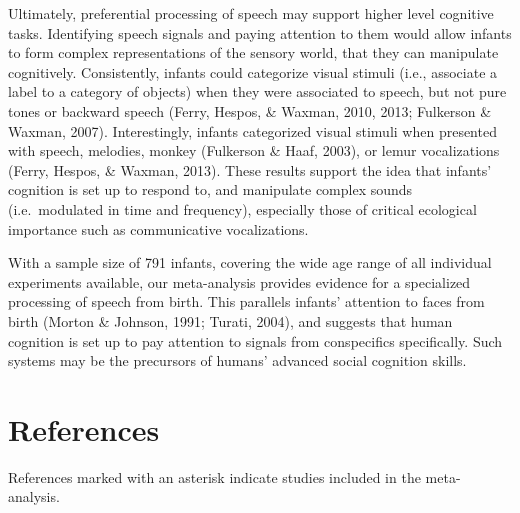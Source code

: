 \documentclass[
  english,
  man]{apa6}
\begin{document}
Ultimately, preferential processing of speech may support higher level cognitive tasks. Identifying speech signals and paying attention to them would allow infants to form complex representations of the sensory world, that they can manipulate cognitively. Consistently, infants could categorize visual stimuli (i.e., associate a label to a category of objects) when they were associated to speech, but not pure tones or backward speech (Ferry, Hespos, \& Waxman, 2010, 2013; Fulkerson \& Waxman, 2007). Interestingly, infants categorized visual stimuli when presented with speech, melodies, monkey (Fulkerson \& Haaf, 2003), or lemur vocalizations (Ferry, Hespos, \& Waxman, 2013). These results support the idea that infants' cognition is set up to respond to, and manipulate complex sounds (i.e.~modulated in time and frequency), especially those of critical ecological importance such as communicative vocalizations.

With a sample size of 791 infants, covering the wide age range of all individual experiments available, our meta-analysis provides evidence for a specialized processing of speech from birth. This parallels infants' attention to faces from birth (Morton \& Johnson, 1991; Turati, 2004), and suggests that human cognition is set up to pay attention to signals from conspecifics specifically. Such systems may be the precursors of humans' advanced social cognition skills.

\newpage

\hypertarget{references}{%
\section{References}\label{references}}

\begingroup
\setlength{\parindent}{-0.5in}
\setlength{\leftskip}{0.5in}

References marked with an asterisk indicate studies included in the meta-analysis.
\end{document}
